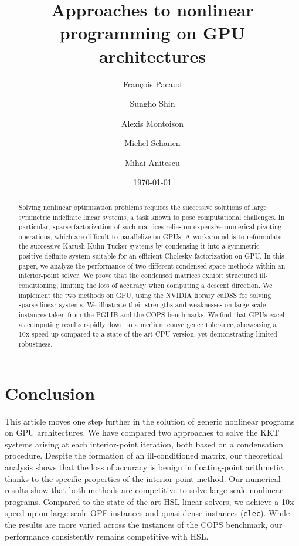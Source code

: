 \documentclass[smallextended]{svjour3}
\title{Approaches to nonlinear programming on GPU architectures}
\author{François Pacaud \and
Sungho Shin \and
Alexis Montoison \and
Michel Schanen \and
Mihai Anitescu
}
\date{\today}
\begin{document}
\maketitle

\begin{abstract}
  Solving nonlinear optimization problems requires the successive solutions of large symmetric indefinite linear systems, a task known to pose computational challenges.
  In particular, sparse factorization of such matrices relies on expensive numerical pivoting operations, which are difficult to parallelize on GPUs.
  A workaround is to reformulate the successive Karush-Kuhn-Tucker systems by condensing it into a symmetric positive-definite system suitable for an efficient Cholesky factorization on GPU.
  In this paper, we analyze the performance of two different condensed-space methods within an interior-point solver.
  We prove that the condensed matrices exhibit structured ill-conditioning, limiting the loss of accuracy when computing a descent direction.
  We implement the two methods on GPU, using the NVIDIA library cuDSS for solving sparse linear systems.
  We illustrate their strengths and weaknesses on large-scale instances taken from the PGLIB and the COPS benchmarks.
  We find that GPUs excel at computing results rapidly down to a medium convergence tolerance, showcasing a 10x speed-up compared to a state-of-the-art CPU version, yet demonstrating limited robustness.
\end{abstract}










\section{Conclusion}
This article moves one step further in the solution of generic nonlinear
programs on GPU architectures. We have compared two approaches
to solve the KKT systems arising at each interior-point iteration, both
based on a condensation procedure.
Despite the formation of an ill-conditioned matrix, our theoretical analysis shows that the loss of accuracy is benign in floating-point arithmetic, thanks to the specific properties of the interior-point method.
Our numerical results show that both methods are competitive to solve large-scale
nonlinear programs.
Compared to the state-of-the-art HSL linear solvers, we achieve a 10x speed-up on large-scale OPF instances and quasi-dense instances (\texttt{elec}). While the results are more varied across the instances of the COPS benchmark, our performance consistently remains competitive with HSL.
\end{document}
